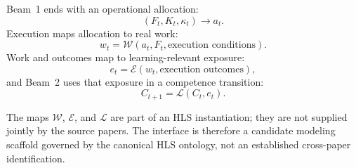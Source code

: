Beam~1 ends with an operational allocation:
\[
(F_t,K_t,\kappa_t)\longrightarrow a_t.
\]
Execution maps allocation to real work:
\[
w_t=\mathcal{W}(a_t,F_t,\text{execution conditions}).
\]
Work and outcomes map to learning-relevant exposure:
\[
e_t=\mathcal{E}(w_t,\text{execution outcomes}),
\]
and Beam~2 uses that exposure in a competence transition:
\[
C_{t+1}=\mathcal{L}(C_t,e_t).
\]

The maps \(\mathcal W\), \(\mathcal E\), and \(\mathcal L\) are part of an HLS
instantiation; they are not supplied jointly by the source papers. The interface is therefore
a candidate modeling scaffold governed by the canonical HLS ontology, not an established
cross-paper identification.
